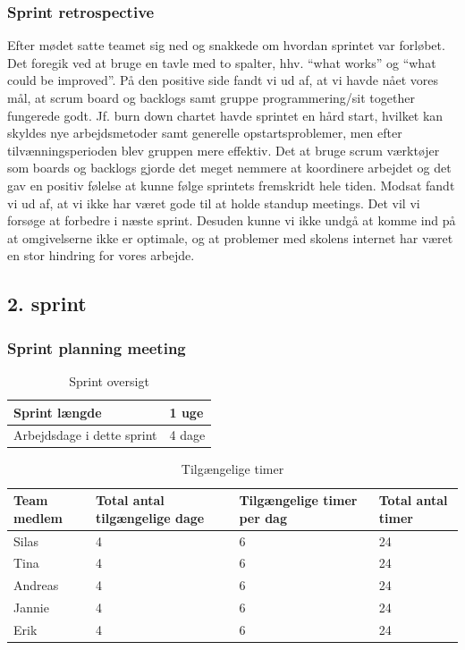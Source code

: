 \documentclass[12pt, a4paper]{report}
\begin{document}
\subsubsection{Sprint retrospective}

Efter mødet satte teamet sig ned og snakkede om hvordan sprintet var forløbet. Det foregik ved at bruge en tavle med to spalter, hhv. “what works” og “what could be improved”. På den positive side fandt vi ud af, at vi havde nået vores mål, at scrum board og backlogs samt gruppe programmering/sit together fungerede godt. Jf. burn down chartet havde sprintet en hård start, hvilket kan skyldes nye arbejdsmetoder samt generelle opstartsproblemer, men efter tilvænningsperioden blev gruppen mere effektiv. Det at bruge scrum værktøjer som boards og backlogs gjorde det meget nemmere at koordinere arbejdet og det gav en positiv følelse at kunne følge sprintets fremskridt hele tiden. Modsat fandt vi ud af, at vi ikke har været gode til at holde standup meetings. Det vil vi forsøge at forbedre i næste sprint. Desuden kunne vi ikke undgå at komme ind på at omgivelserne ikke er optimale, og at problemer med skolens internet har været en stor hindring for vores arbejde.

\subsection{2. sprint}
\subsubsection{Sprint planning meeting}
\begin{table}[ht]
\centering
\caption{Sprint oversigt}
\label{sprint2oversigt}

\begin{tabular}{| l | l |}

\hline
Sprint længde & 1 uge \\ \hline
Arbejdsdage i dette sprint & 4 dage \\
\hline
\end{tabular}
\end{table}

\begin{table}[ht]
\caption{Tilgængelige timer}
\label{sprint2timer}
\begin{tabular}{| p{3cm} | p{4cm} | p{4cm} | p{4cm} |}
\hline
Team medlem & Total antal tilgængelige dage & Tilgængelige timer per dag & Total antal timer \\ \hline
Silas & 4 & 6 & 24 \\ \hline
Tina & 4 & 6 & 24 \\ \hline
Andreas & 4 & 6 & 24 \\ \hline
Jannie & 4 & 6 & 24 \\ \hline
Erik & 4 & 6 & 24 \\
\hline
\end{tabular}
\end{table}
\end{document}
